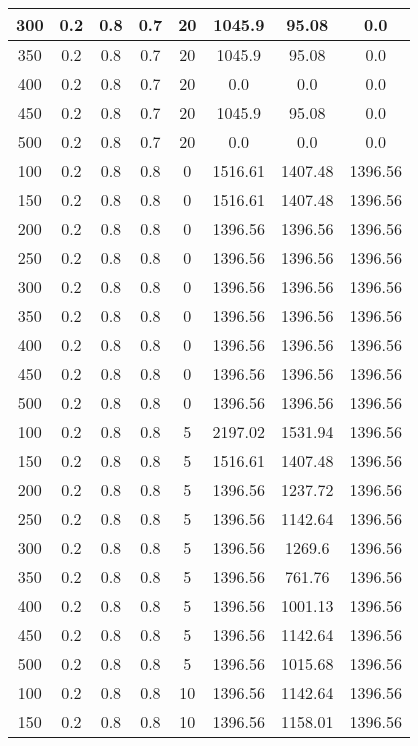 \documentclass[a4paper, 12pt]{extreport}
\begin{document}
\begin{itemize}
\begin{longtable}{|c|c|c|c|c|c|c|c|}
			300 & 0.2 & 0.8 & 0.7 & 20 & 1045.9 & 95.08 & 0.0 \\\hline
			350 & 0.2 & 0.8 & 0.7 & 20 & 1045.9 & 95.08 & 0.0 \\\hline
			400 & 0.2 & 0.8 & 0.7 & 20 & 0.0 & 0.0 & 0.0 \\\hline
			450 & 0.2 & 0.8 & 0.7 & 20 & 1045.9 & 95.08 & 0.0 \\\hline
			500 & 0.2 & 0.8 & 0.7 & 20 & 0.0 & 0.0 & 0.0 \\\hline
			100 & 0.2 & 0.8 & 0.8 & 0 & 1516.61 & 1407.48 & 1396.56 \\\hline
			150 & 0.2 & 0.8 & 0.8 & 0 & 1516.61 & 1407.48 & 1396.56 \\\hline
			200 & 0.2 & 0.8 & 0.8 & 0 & 1396.56 & 1396.56 & 1396.56 \\\hline
			250 & 0.2 & 0.8 & 0.8 & 0 & 1396.56 & 1396.56 & 1396.56 \\\hline
			300 & 0.2 & 0.8 & 0.8 & 0 & 1396.56 & 1396.56 & 1396.56 \\\hline
			350 & 0.2 & 0.8 & 0.8 & 0 & 1396.56 & 1396.56 & 1396.56 \\\hline
			400 & 0.2 & 0.8 & 0.8 & 0 & 1396.56 & 1396.56 & 1396.56 \\\hline
			450 & 0.2 & 0.8 & 0.8 & 0 & 1396.56 & 1396.56 & 1396.56 \\\hline
			500 & 0.2 & 0.8 & 0.8 & 0 & 1396.56 & 1396.56 & 1396.56 \\\hline
			100 & 0.2 & 0.8 & 0.8 & 5 & 2197.02 & 1531.94 & 1396.56 \\\hline
			150 & 0.2 & 0.8 & 0.8 & 5 & 1516.61 & 1407.48 & 1396.56 \\\hline
			200 & 0.2 & 0.8 & 0.8 & 5 & 1396.56 & 1237.72 & 1396.56 \\\hline
			250 & 0.2 & 0.8 & 0.8 & 5 & 1396.56 & 1142.64 & 1396.56 \\\hline
			300 & 0.2 & 0.8 & 0.8 & 5 & 1396.56 & 1269.6 & 1396.56 \\\hline
			350 & 0.2 & 0.8 & 0.8 & 5 & 1396.56 & 761.76 & 1396.56 \\\hline
			400 & 0.2 & 0.8 & 0.8 & 5 & 1396.56 & 1001.13 & 1396.56 \\\hline
			450 & 0.2 & 0.8 & 0.8 & 5 & 1396.56 & 1142.64 & 1396.56 \\\hline
			500 & 0.2 & 0.8 & 0.8 & 5 & 1396.56 & 1015.68 & 1396.56 \\\hline
			100 & 0.2 & 0.8 & 0.8 & 10 & 1396.56 & 1142.64 & 1396.56 \\\hline
			150 & 0.2 & 0.8 & 0.8 & 10 & 1396.56 & 1158.01 & 1396.56 \\\hline

\end{longtable}
\end{itemize}
\end{document}
